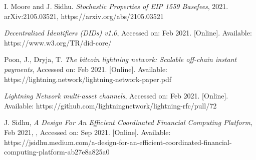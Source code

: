 \documentclass[peerreview]{ieeesyscoin}
\begin{document}
\begin{thebibliography}{00}
  I. Moore and J. Sidhu. \textit{Stochastic Properties of EIP 1559 Basefees}, 2021. arXiv:2105.03521,  https://arxiv.org/abs/2105.03521

  \textit{Decentralized Identifiers (DIDs) v1.0}, Accessed on: Feb 2021. [Online]. Available: https://www.w3.org/TR/did-core/

  Poon, J., Dryja, T. \textit{The bitcoin lightning network: Scalable off-chain instant payments}, Accessed on: Feb 2021. [Online]. Available: https://lightning.network/lightning-network-paper.pdf

  \textit{Lightning Network multi-asset channels}, Accessed on: Feb 2021. [Online]. Available: https://github.com/lightningnetwork/lightning-rfc/pull/72

 J. Sidhu, \textit{A Design For An Efficient Coordinated Financial Computing Platform}, Feb 2021, , Accessed on: Sep 2021.  [Online]. Available:  https://jsidhu.medium.com/a-design-for-an-efficient-coordinated-financial-computing-platform-ab27e8a825a0




\end{thebibliography}


\EOD
\end{document}
